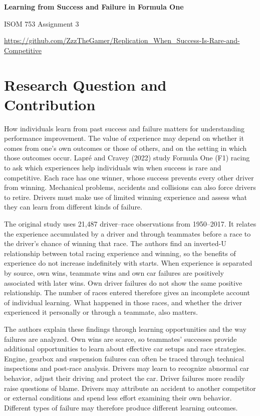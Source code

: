 \documentclass[11pt,letterpaper]{article}
\begin{document}
\begin{center}
{\Large\bfseries Learning from Success and Failure in Formula One}\par
\vspace{4pt}
{\normalsize ISOM 753 Assignment 3}
\par\vspace{3pt}
{\small\url{https://github.com/ZzzTheGamer/Replication_When_Success-Is-Rare-and-Competitive}}
\end{center}
\vspace{-3pt}

\section{Research Question and Contribution}

How individuals learn from past success and failure matters for understanding performance improvement. The value of experience may depend on whether it comes from one's own outcomes or those of others, and on the setting in which those outcomes occur. Lapr\'{e} and Cravey (2022) study Formula One (F1) racing to ask which experiences help individuals win when success is rare and competitive. Each race has one winner, whose success prevents every other driver from winning. Mechanical problems, accidents and collisions can also force drivers to retire. Drivers must make use of limited winning experience and assess what they can learn from different kinds of failure.

The original study uses 21,487 driver--race observations from 1950--2017. It relates the experience accumulated by a driver and through teammates before a race to the driver's chance of winning that race. The authors find an inverted-U relationship between total racing experience and winning, so the benefits of experience do not increase indefinitely with starts. When experience is separated by source, own wins, teammate wins and own car failures are positively associated with later wins. Own driver failures do not show the same positive relationship. The number of races entered therefore gives an incomplete account of individual learning. What happened in those races, and whether the driver experienced it personally or through a teammate, also matters.

The authors explain these findings through learning opportunities and the way failures are analyzed. Own wins are scarce, so teammates' successes provide additional opportunities to learn about effective car setups and race strategies. Engine, gearbox and suspension failures can often be traced through technical inspections and post-race analysis. Drivers may learn to recognize abnormal car behavior, adjust their driving and protect the car. Driver failures more readily raise questions of blame. Drivers may attribute an accident to another competitor or external conditions and spend less effort examining their own behavior. Different types of failure may therefore produce different learning outcomes.
\end{document}
